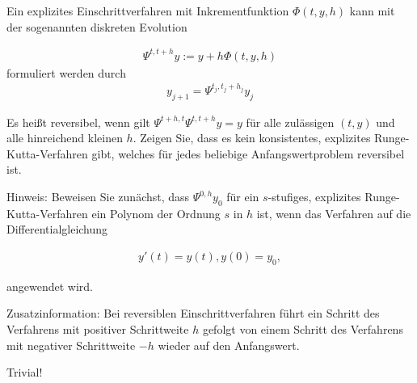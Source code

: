 \begin{exercise}
  Ein explizites Einschrittverfahren mit Inkrementfunktion $\Phi(t,y,h)$
  kann mit der sogenannten diskreten Evolution

  \begin{align}
    \Psi^{t,t+h}y := y + h\Phi(t,y,h)
  \end{align}
  formuliert werden durch
  \begin{align}
    y_{j+1}=\Psi^{t_j,t_j + h_j} y_j
  \end{align}

  Es heißt reversibel, wenn gilt $\Psi^{t+h,t}\Psi^{t,t+h}y = y$
  für alle zulässigen $(t,y)$ und alle hinreichend kleinen $h$. Zeigen Sie, dass
  es kein konsistentes, explizites Runge-Kutta-Verfahren gibt, welches für jedes
  beliebige Anfangswertproblem reversibel ist.

  Hinweis: Beweisen Sie zunächst, dass $\Psi^{0,h} y_0$ für ein $s$-stufiges,
  explizites Runge-Kutta-Verfahren ein Polynom der Ordnung $s$ in $h$ ist, wenn
  das Verfahren auf die Differentialgleichung

  \begin{align}
    y'(t)=y(t), y(0)=y_0,
  \end{align}

  angewendet wird.

  Zusatzinformation: Bei reversiblen Einschrittverfahren führt ein Schritt des
  Verfahrens mit positiver Schrittweite $h$ gefolgt von einem Schritt des Verfahrens
  mit negativer Schrittweite $-h$ wieder auf den Anfangswert.
\end{exercise}

\begin{solution}
  Trivial!
\end{solution}
